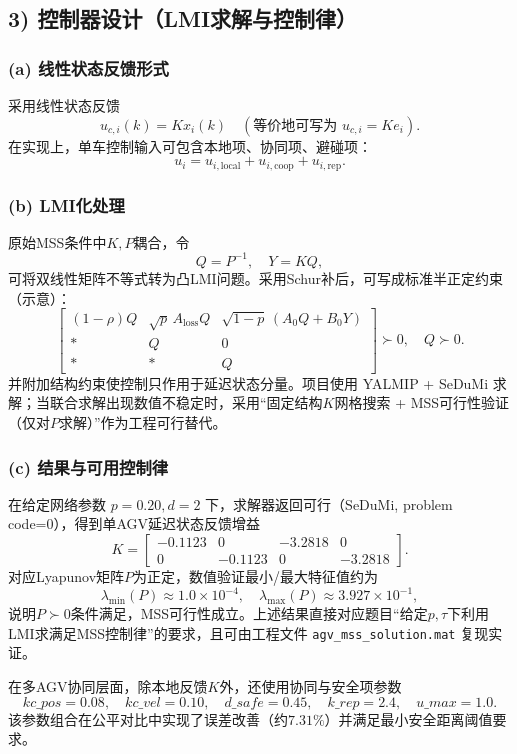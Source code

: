 \documentclass[12pt,a4paper]{article}
\begin{document}
\subsection{3) 控制器设计（LMI求解与控制律）}
\subsubsection*{(a) 线性状态反馈形式}
采用线性状态反馈
\[
u_{c,i}(k)=Kx_i(k)\quad(\text{等价地可写为 }u_{c,i}=Ke_i).
\]
在实现上，单车控制输入可包含本地项、协同项、避碰项：
\[
u_i=u_{i,\text{local}}+u_{i,\text{coop}}+u_{i,\text{rep}}.
\]

\subsubsection*{(b) LMI化处理}
原始MSS条件中$K,P$耦合，令
\[
Q=P^{-1},\quad Y=KQ,
\]
可将双线性矩阵不等式转为凸LMI问题。采用Schur补后，可写成标准半正定约束（示意）：
\[
\begin{bmatrix}
(1-\rho)Q & \sqrt{p}\,A_{\text{loss}}Q & \sqrt{1-p}\,(A_0Q+B_0Y)\\
* & Q & 0\\
* & * & Q
\end{bmatrix}\succ 0,\quad Q\succ 0.
\]
并附加结构约束使控制只作用于延迟状态分量。项目使用 YALMIP + SeDuMi 求解；当联合求解出现数值不稳定时，采用“固定结构$K$网格搜索 + MSS可行性验证（仅对$P$求解）”作为工程可行替代。

\subsubsection*{(c) 结果与可用控制律}
在给定网络参数 $p=0.20,d=2$ 下，求解器返回可行（SeDuMi, problem code=0），得到单AGV延迟状态反馈增益
\[
K=
\begin{bmatrix}
-0.1123 & 0 & -3.2818 & 0\\
0 & -0.1123 & 0 & -3.2818
\end{bmatrix}.
\]
对应Lyapunov矩阵$P$为正定，数值验证最小/最大特征值约为
\[
\lambda_{\min}(P)\approx 1.0\times 10^{-4},\quad
\lambda_{\max}(P)\approx 3.927\times 10^{-1},
\]
说明$P\succ0$条件满足，MSS可行性成立。上述结果直接对应题目“给定$p,\tau$下利用LMI求满足MSS控制律”的要求，且可由工程文件 \texttt{agv\_mss\_solution.mat} 复现实证。

在多AGV协同层面，除本地反馈$K$外，还使用协同与安全项参数
\[
kc\_pos=0.08,\quad kc\_vel=0.10,\quad d\_safe=0.45,\quad k\_rep=2.4,\quad u\_max=1.0.
\]
该参数组合在公平对比中实现了误差改善（约$7.31\%$）并满足最小安全距离阈值要求。
\end{document}
